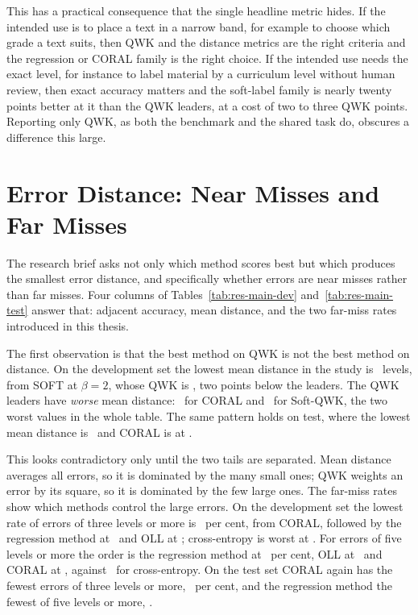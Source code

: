 This has a practical consequence that the single headline metric hides. If the intended use is
to place a text in a narrow band, for example to choose which grade a text suits, then QWK and
the distance metrics are the right criteria and the regression or CORAL family is the right
choice. If the intended use needs the exact level, for instance to label material by a
curriculum level without human review, then exact accuracy matters and the soft-label family is
nearly twenty points better at it than the QWK leaders, at a cost of two to three QWK points.
Reporting only QWK, as both the benchmark and the shared task do, obscures a difference this
large.

\section{Error Distance: Near Misses and Far Misses}
\label{sec:res-distance}

The research brief asks not only which method scores best but which produces the smallest error
distance, and specifically whether errors are near misses rather than far misses. Four columns
of Tables~\ref{tab:res-main-dev} and~\ref{tab:res-main-test} answer that: adjacent accuracy,
mean distance, and the two far-miss rates introduced in this thesis.

The first observation is that the best method on QWK is not the best method on distance. On the
development set the lowest mean distance in the study is \devDistSoftTwo\ levels, from SOFT at
$\beta=2$, whose QWK is \devQwkSoftTwo, two points below the leaders. The QWK leaders have
\emph{worse} mean distance: \devDistCoral\ for CORAL and \devDistSoftqwk\ for Soft-QWK, the two
worst values in the whole table. The same pattern holds on test, where the lowest mean distance
is \testDistSoftTwo\ and CORAL is at \testDistCoral.

This looks contradictory only until the two tails are separated. Mean distance averages all
errors, so it is dominated by the many small ones; QWK weights an error by its square, so it is
dominated by the few large ones. The far-miss rates show which methods control the large
errors. On the development set the lowest rate of errors of three levels or more is
\devFarThreeCoral\ per cent, from CORAL, followed by the regression method at
\devFarThreeMSE\ and OLL at \devFarThreeOLL; cross-entropy is worst at \devFarThreeCE. For
errors of five levels or more the order is the regression method at \devFarFiveMSE\ per cent,
OLL at \devFarFiveOLL\ and CORAL at \devFarFiveCoral, against \devFarFiveCE\ for cross-entropy.
On the test set CORAL again has the fewest errors of three levels or more, \testFarThreeCoral\
per cent, and the regression method the fewest of five levels or more, \testFarFiveMSE.

